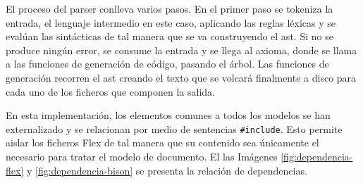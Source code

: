 El proceso del parser conlleva varios pasos. En el primer paso se tokeniza la entrada, el lenguaje intermedio en este caso, aplicando las reglas léxicas y se evalúan las sintácticas de tal manera que se va construyendo el \acrlong{ast}. Si no se produce ningún error, se consume la entrada y se llega al axioma, donde se llama a las funciones de generación de código, pasando el árbol. Las funciones de generación recorren el \acrshort{ast} creando el texto que se volcará finalmente a disco para cada uno de los ficheros que componen la salida.


En esta implementación, los elementos comunes a todos los modelos se han externalizado y se relacionan por medio de sentencias \verb|#include|. Esto permite aislar los ficheros Flex de tal manera que su contenido sea únicamente el necesario para tratar el modelo de documento. El las Imágenes \ref{fig:dependencia-flex} y \ref{fig:dependencia-bison} se presenta la relación de dependencias.

